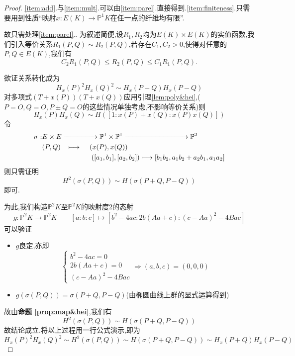 \documentclass[12pt,A4paper,oneside,reqno]{amsart}
\numberwithin{equation}{section}
\theoremstyle{definition}
\theoremstyle{plain}
\theoremstyle{plain}
\numberwithin{equation}{section}
\theoremstyle{remark}
\begin{document}
\begin{proof}
	\ref{item:add}.与\ref{item:mult}.可以由\ref{item:parel}.直接得到.\ref{item:finiteness}.只需要用到性质“映射$x:E(K) \longrightarrow \mathbb{P}^1K$在任一点的纤维均有限”.
	
	故只需处理\ref{item:parel}.. 为叙述简便,设$R_1,R_2$均为$E(K) \times E(K)$的实值函数,我们引入等价关系$R_1(P,Q) \sim R_2(P,Q)$,若存在$C_1,C_2>0$,使得对任意的$P,Q \in E(K)$,我们有
	$$C_2R_1(P,Q) \leqslant R_2(P,Q) \leqslant C_1R_1(P,Q).$$
	
	欲证关系转化成为
	$$H_x(P)^2H_x(Q)^2 \sim H_x(P+Q)H_x(P-Q)$$
	对多项式$(T+x(P))(T+x(Q))$应用引理\ref*{lem:poly&hei},($P=O,Q=O,P \pm Q=O$的这些情况单独考虑,不影响等价关系)则
	$$H_x(P)H_x(Q) \sim H\left([1:x(P)+x(Q):x(P)x(Q)]\right)$$
	令
	\begin{equation*}
	\begin{aligned}
	\sigma:&E \times E \xrightarrow{\hspace*{1.5cm}} \mathbb{P}^1 \times \mathbb{P}^1 \xrightarrow{\hspace*{3cm}} \mathbb{P}^2\\
	&(P,Q) \hspace{3mm}\longmapsto\hspace{4mm} (x(P),x(Q))\\
	&\hspace{2.5cm}([a_1,b_1],[a_2,b_2]) \longmapsto [b_1b_2,a_1b_2+a_2b_1,a_1a_2]
	\end{aligned}
	\end{equation*}
	则只需证明
	$$H^2(\sigma(P,Q)) \sim H(\sigma(P+Q,P-Q))$$
	即可.
	
	为此,我们构造$\mathbb{P}^2K$至$\mathbb{P}^2K$的映射度2的态射
	$$g:\mathbb{P}^2K \longrightarrow \mathbb{P}^2K \qquad [a:b:c] \longmapsto [b^2-4ac: 2b(Aa+c):(c-Aa)^2-4Bac]$$
	可以验证
	\begin{itemize}
		\item $g$良定,亦即
		$$\begin{cases}
		b^2-4ac=0\\
		2b(Aa+c)=0\\
		(c-Aa)^2-4Bac
		\end{cases} \Longrightarrow (a,b,c)=(0,0,0)$$
		\item $g(\sigma(P,Q))=\sigma(P+Q,P-Q)$(由椭圆曲线上群的显式运算得到)
	\end{itemize}
故由\textbf{命题 \ref{prop:map&hei}},我们有
$$H^2(\sigma(P,Q)) \sim H(\sigma(P+Q,P-Q))$$
故结论成立.将以上过程用一行公式演示,即为
$$H_x(P)^2H_x(Q)^2 \sim H^2(\sigma(P,Q)) \sim H(\sigma(P+Q,P-Q)) \sim H_x(P+Q)H_x(P-Q)$$
\end{proof}
\end{document}
